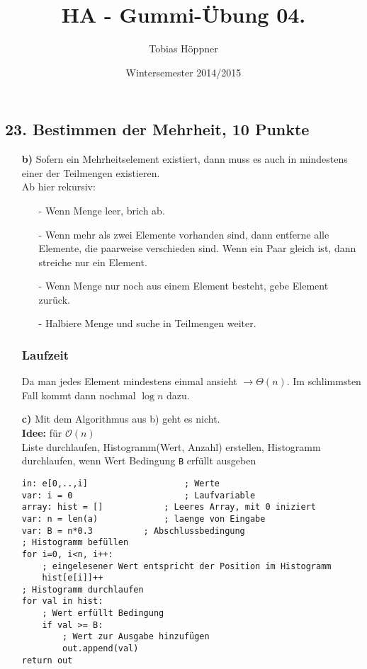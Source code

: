 \documentclass[ngerman,a4paper]{report}
\author{Tobias Höppner}
\title{HA - Gummi-Übung 04. }
\date{Wintersemester 2014/2015}
\renewcommand{\maketitle}{}
\begin{document}
 
\maketitle 

\subsection*{23. Bestimmen der Mehrheit, 10 Punkte}

\begin{enumerate}
\item[\textbf{b)}]
Sofern ein Mehrheitselement existiert, dann muss es auch in mindestens einer der Teilmengen existieren.\\
Ab hier rekursiv:
\begin{enumerate}
\item[-] Wenn Menge leer, brich ab.
\item[-] Wenn mehr als zwei Elemente vorhanden sind, dann entferne alle Elemente, die paarweise verschieden sind. Wenn ein Paar gleich ist, dann streiche nur ein Element.
\item[-] Wenn Menge nur noch aus einem Element besteht, gebe Element zurück.
\item[-] Halbiere Menge und suche in Teilmengen weiter. 
\end{enumerate}
\subsubsection*{Laufzeit}
Da man jedes Element mindestens einmal ansieht $\rightarrow \Theta (n)$. Im schlimmsten Fall kommt dann nochmal $\log n$ dazu.\\
\item[\textbf{c)}] Mit dem Algorithmus aus b) geht es nicht.\\
\textbf{Idee:} für $\mathcal{O}(n)$\\
Liste durchlaufen, Histogramm(Wert, Anzahl) erstellen, Histogramm durchlaufen, wenn Wert Bedingung \lstinline!B! erfüllt ausgeben
\begin{lstlisting}
in: e[0,..,i]					; Werte
var: i = 0						; Laufvariable
array: hist = []			; Leeres Array, mit 0 iniziert
var: n = len(a) 			; laenge von Eingabe
var: B = n*0.3			; Abschlussbedingung
; Histogramm befüllen
for i=0, i<n, i++:
	; eingelesener Wert entspricht der Position im Histogramm
	hist[e[i]]++
; Histogramm durchlaufen
for val in hist:
	; Wert erfüllt Bedingung
	if val >= B:
		; Wert zur Ausgabe hinzufügen
		out.append(val)
return out
\end{lstlisting}

\end{enumerate}
\end{document}
